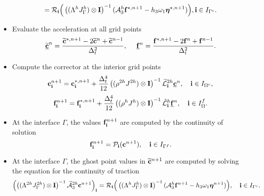 \begin{breakablealgorithm}
\begin{itemize}
{\begin{equation}
			= {\mathcal{R}}_{\bf i}\Big(\left((\Lambda^hJ_{\Gamma}^h)\otimes{\bf I}\right)^{-1}(\mathcal{A}_3^h{\bf f}^{\star,n+1}-h_3\omega_1{\bm \eta}^{\star,n+1})\Big), {\bf i}\in I_{\Gamma^c}.
			\end{equation}
		}
		\item{Evaluate the acceleration at all grid points 
			\begin{equation*}
			\underline{\widetilde{\bf c}}^n= \frac{\widetilde{\bf c}^{*,n+1}-2\widetilde{\bf c}^{n}+\widetilde{\bf c}^{n-1}}{\Delta^2_t},\ \ \ \
			\underline{{\bf f}}^{n} = \frac{{\bf f}^{*,n+1}-2{\bf f}^{n}+{\bf f}^{n-1}}{\Delta^2_t}.
			\end{equation*}
		}
		\item{Compute the corrector at the interior grid points
			\[{\bf c}^{n+1}_{\bf i} = {\bf c}^{*,n+1}_{\bf i} + \frac{\Delta_t^4}{12}\left((\rho^{2h}J^{2h})\otimes{\bf I}\right)^{-1}\widetilde{\mathcal{L}}^{2h}_{\bf i}\underline{{\bf{c}}}^{n},\quad {\bf i}\in I_{\Omega^c},\]
			\[{\bf f}^{n+1}_{\bf i} = {\bf f}^{*,n+1}_{\bf i} + \frac{\Delta_t^4}{12}\left((\rho^{h}J^h)\otimes{\bf I}\right)^{-1}\hat{\mathcal{L}}^{h}_{\bf i}\underline{{\bf{f}}}^{n},\quad {\bf i}\in I_\Omega^f.\]
		}
		\item{At the interface $\Gamma$, the values ${\bf f}^{n+1}_{\bf i}$  are computed by the continuity of solution
			\begin{equation*}
			{\bf f}^{n+1}_{\bf i} = {\mathcal{P}}_{\bf i}({\bf c}^{n+1}), \quad {\bf i}\in I_{\Gamma^f}.
			\end{equation*}
		}
		\item{At the interface $\Gamma$, the ghost point values in $\widetilde{\bf c}^{n+1}$ are computed by solving the equation for the continuity of traction
			\begin{equation}\label{traction_gamma_corr}
			\left(\left((\Lambda^{2h}J^{2h}_{\Gamma})\otimes{\bf I}\right)^{-1}\wt{\mathcal{A}}_3^{2h}{\bf c}^{n+1}\right)_{\bf i}
			= {\mathcal{R}}_{\bf i}\Big(\left((\Lambda^hJ^h_{\Gamma})\otimes{\bf I}\right)^{-1}(\mathcal{A}_3^h{\bf f}^{n+1}-h_3\omega_1{\bm \eta}^{n+1})\Big), \quad {\bf i}\in I_{\Gamma^c}.
			\end{equation}
		}
	\end{itemize}
\end{breakablealgorithm}
~\\

